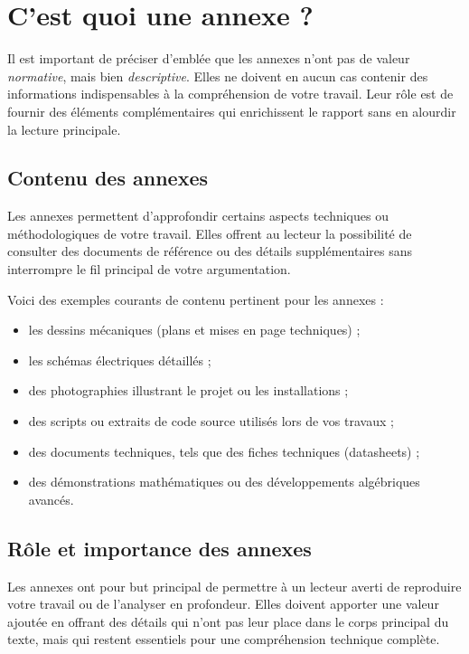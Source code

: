 \chapter{C'est quoi une annexe ?}

Il est important de préciser d'emblée que les annexes n'ont pas de valeur \emph{normative}, mais bien \emph{descriptive}. Elles ne doivent en aucun cas contenir des informations indispensables à la compréhension de votre travail. Leur rôle est de fournir des éléments complémentaires qui enrichissent le rapport sans en alourdir la lecture principale.

\section{Contenu des annexes}

Les annexes permettent d'approfondir certains aspects techniques ou méthodologiques de votre travail. Elles offrent au lecteur la possibilité de consulter des documents de référence ou des détails supplémentaires sans interrompre le fil principal de votre argumentation.

Voici des exemples courants de contenu pertinent pour les annexes :

\begin{itemize}
    \item les dessins mécaniques (plans et mises en page techniques) ;
    \item les schémas électriques détaillés ;
    \item des photographies illustrant le projet ou les installations ;
    \item des scripts ou extraits de code source utilisés lors de vos travaux ;
    \item des documents techniques, tels que des fiches techniques (datasheets) ;
    \item des démonstrations mathématiques ou des développements algébriques avancés.
\end{itemize}

\section{Rôle et importance des annexes}

Les annexes ont pour but principal de permettre à un lecteur averti de reproduire votre travail ou de l'analyser en profondeur. Elles doivent apporter une valeur ajoutée en offrant des détails qui n'ont pas leur place dans le corps principal du texte, mais qui restent essentiels pour une compréhension technique complète.

